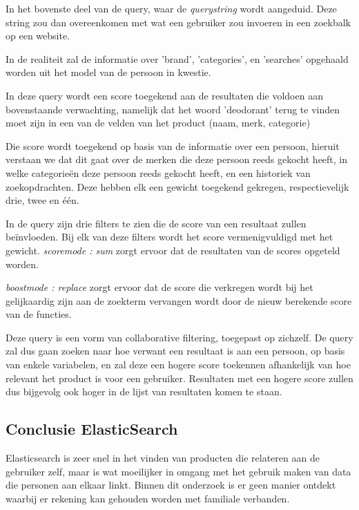 In het bovenste deel van de query, waar de \textit{query\textunderscore string} wordt aangeduid. Deze string zou dan overeenkomen met wat een gebruiker zou invoeren in een zoekbalk op een website.

In de realiteit zal de informatie over 'brand', 'categories', en 'searches' opgehaald worden uit het model van de persoon in kwestie.

In deze query wordt een score toegekend aan de resultaten die voldoen aan bovenstaande verwachting, namelijk dat het woord 'deodorant' terug te vinden moet zijn in een van de velden van het product (naam, merk, categorie)

Die score wordt toegekend op basis van de informatie over een persoon, hieruit verstaan we dat dit gaat over de merken die deze persoon reeds gekocht heeft, in welke categorieën deze persoon reeds gekocht heeft, en een historiek van zoekopdrachten. Deze hebben elk een gewicht toegekend gekregen, respectievelijk drie, twee en één. 

In de query zijn drie filters te zien die de score van een resultaat zullen beïnvloeden. Bij elk van deze filters wordt het score vermenigvuldigd met het gewicht. \textit{score\textunderscore mode : sum} zorgt ervoor dat de resultaten van de scores opgeteld worden.

\textit{boost\textunderscore mode : replace} zorgt ervoor dat de score die verkregen wordt bij het gelijkaardig zijn aan de zoekterm vervangen wordt door de nieuw berekende score van de functies.

Deze query is een vorm van collaborative filtering, toegepast op zichzelf. De query zal dus gaan zoeken naar hoe verwant een resultaat is aan een persoon, op basis van enkele variabelen, en zal deze een hogere score toekennen afhankelijk van hoe relevant het product is voor een gebruiker. Resultaten met een hogere score zullen dus bijgevolg ook hoger in de lijst van resultaten komen te staan.

\subsection{Conclusie ElasticSearch}
\label{sec:Conclusie Elasticsearch}

Elasticsearch is zeer snel in het vinden van producten die relateren aan de gebruiker zelf, maar is wat moeilijker in omgang met het gebruik maken van data die personen aan elkaar linkt. Binnen dit onderzoek is er geen manier ontdekt waarbij er rekening kan gehouden worden met familiale verbanden. 

